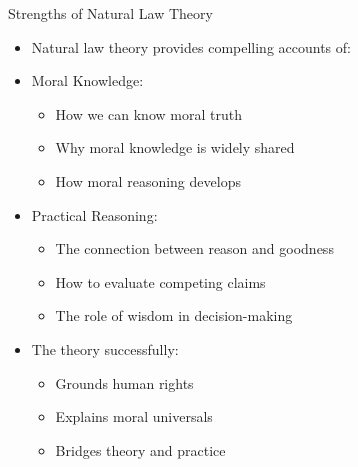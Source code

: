 \documentclass{beamer}
\begin{document}
\begin{frame}{Strengths of Natural Law Theory}
    \begin{itemize}
        \item Natural law theory provides compelling accounts of:
        
        \item Moral Knowledge:
        \begin{itemize}
            \item How we can know moral truth
            \item Why moral knowledge is widely shared
            \item How moral reasoning develops
        \end{itemize}
        
        \item Practical Reasoning:
        \begin{itemize}
            \item The connection between reason and goodness
            \item How to evaluate competing claims
            \item The role of wisdom in decision-making
        \end{itemize}
        
        \item The theory successfully:
            \begin{itemize}
                \item Grounds human rights
                \item Explains moral universals
                \item Bridges theory and practice
            \end{itemize}
    \end{itemize}
\end{frame}
\end{document}
